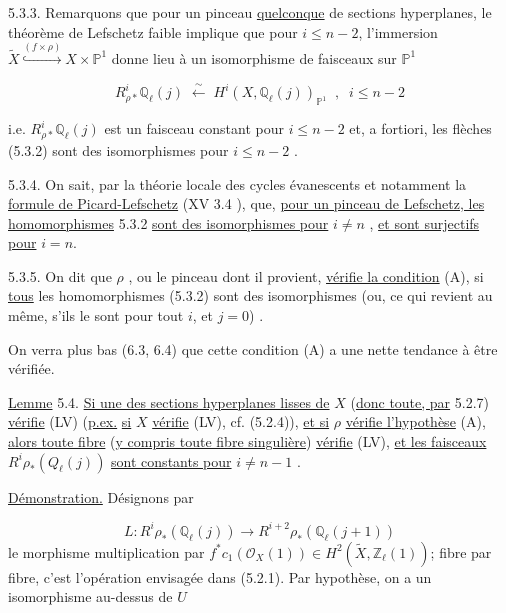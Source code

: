 5.3.3. Remarquons que pour un pinceau \underline{quelconque} de sections hyperplanes, le théorème de Lefschetz faible implique que pour $i \leq n-2$, l'immersion $\widetilde{X} \overset{(f\times\rho)}{\hookrightarrow} X\times\mathbb{P}^1$ donne lieu à un isomorphisme de faisceaux sur $\mathbb{P}^1$

\begin{equation*}
R^i_{\rho*}\mathbb{Q}_\ell(j) \; \xleftarrow{\ \sim\ } \; H^i(X,\mathbb{Q}_\ell(j))_{\mathbb{P}^1} \;\; , \;\; i \leq n-2
\end{equation*}


 i.e. $R^i_{\rho *}\mathbb{Q}_\ell(j)$ est un faisceau constant pour $i \leq n-2$ et, a fortiori, les flèches (5.3.2) sont des isomorphismes pour $i \leq n-2$ .

5.3.4. On sait, par la théorie locale des cycles évanescents et notamment la \underline{formule de Picard-Lefschetz} (XV 3.4 ), que, \underline{pour un pinceau de Lefschetz, les homomorphismes} 5.3.2 \underline{sont des isomorphismes pour} $i \neq n$ , \underline{et sont surjectifs pour} $i = n$.

5.3.5. On dit que $\rho$ , ou le pinceau dont il provient, \underline{vérifie la condition} (A), si \underline{tous} les homomorphismes (5.3.2) sont des isomorphismes (ou, ce qui revient au même, s'ils le sont pour tout $i$, et $j = 0$) .

On verra plus bas (6.3, 6.4) que cette condition (A) a une nette tendance à être vérifiée.

\underline{Lemme} 5.4. \underline{Si une des sections hyperplanes lisses de} $X$ (\underline{donc toute, par} 5.2.7) \underline{vérifie} (LV) (\underline{p.ex.} \underline{si} $X$ \underline{vérifie} (LV), cf. (5.2.4)), \underline{et si} $\rho$ \underline{vérifie l'hypothèse} (A), \underline{alors toute fibre} (\underline{y compris toute fibre singulière}) \underline{vérifie} (LV), \underline{et les faisceaux} $R^i\rho_*(Q_\ell(j))$ \underline{sont constants pour} $i \neq n-1$ .

\underline{Démonstration.} Désignons par

\begin{equation*}
L : R^i\rho_*(\mathbb{Q}_\ell(j)) \longrightarrow R^{i+2}\rho_*(\mathbb{Q}_\ell(j+1))
\end{equation*}
le morphisme multiplication par $f^*c_1(\mathcal{O}_X(1)) \in H^2(\widetilde{X},\mathbb{Z}_\ell(1))$; fibre par fibre, c'est l'opération envisagée dans (5.2.1). Par hypothèse, on a
un isomorphisme au-dessus de $U$

